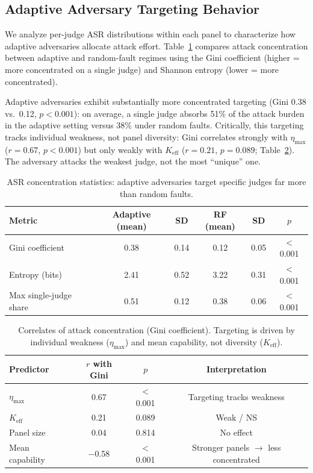 \documentclass[11pt,a4paper]{article}
\begin{document}
\subsection{Adaptive Adversary Targeting Behavior}
\label{sec:targeting}

We analyze per-judge ASR distributions within each panel to characterize how adaptive adversaries allocate attack effort.
Table~\ref{tab:concentration} compares attack concentration between adaptive and random-fault regimes using the Gini coefficient (higher = more concentrated on a single judge) and Shannon entropy (lower = more concentrated).

Adaptive adversaries exhibit substantially more concentrated targeting (Gini 0.38 vs.\ 0.12, $p < 0.001$): on average, a single judge absorbs 51\% of the attack burden in the adaptive setting versus 38\% under random faults.
Critically, this targeting tracks individual weakness, not panel diversity: Gini correlates strongly with $\eta_{\max}$ ($r = 0.67$, $p < 0.001$) but only weakly with $K_{\mathrm{eff}}$ ($r = 0.21$, $p = 0.089$; Table~\ref{tab:gini_corr}).
The adversary attacks the weakest judge, not the most ``unique'' one.

\begin{table}[t]
\centering
\caption{ASR concentration statistics: adaptive adversaries target specific judges far more than random faults.}
\label{tab:concentration}
\small
\begin{tabular}{lccccc}
\toprule
\textbf{Metric} & \textbf{Adaptive (mean)} & \textbf{SD} & \textbf{RF (mean)} & \textbf{SD} & \textbf{$p$} \\
\midrule
Gini coefficient & 0.38 & 0.14 & 0.12 & 0.05 & $<$0.001 \\
Entropy (bits) & 2.41 & 0.52 & 3.22 & 0.31 & $<$0.001 \\
Max single-judge share & 0.51 & 0.12 & 0.38 & 0.06 & $<$0.001 \\
\bottomrule
\end{tabular}
\end{table}

\begin{table}[t]
\centering
\caption{Correlates of attack concentration (Gini coefficient). Targeting is driven by individual weakness ($\eta_{\max}$) and mean capability, not diversity ($K_{\mathrm{eff}}$).}
\label{tab:gini_corr}
\small
\begin{tabular}{lccc}
\toprule
\textbf{Predictor} & $r$ \textbf{with Gini} & $p$ & \textbf{Interpretation} \\
\midrule
$\eta_{\max}$ & 0.67 & $<$0.001 & Targeting tracks weakness \\
$K_{\mathrm{eff}}$ & 0.21 & 0.089 & Weak / NS \\
Panel size & 0.04 & 0.814 & No effect \\
Mean capability & $-$0.58 & $<$0.001 & Stronger panels $\to$ less concentrated \\
\bottomrule
\end{tabular}
\end{table}
\end{document}
